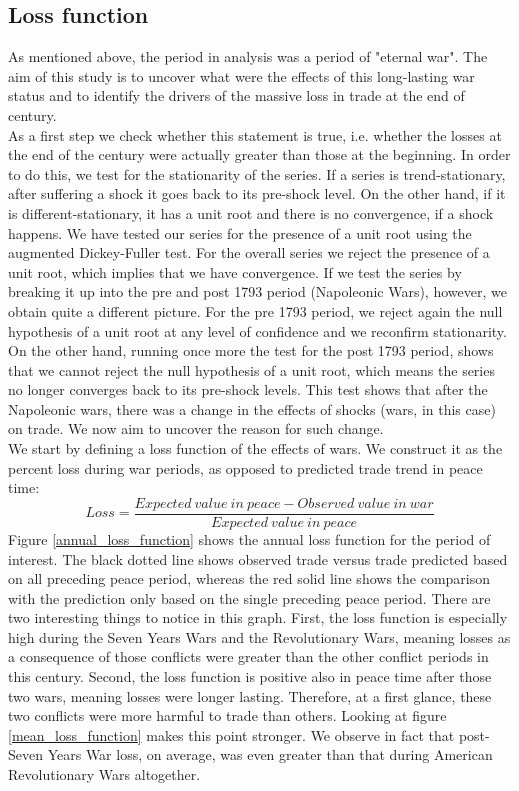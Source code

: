\documentclass[12pt,a4paper,notitlepage,english]{article}
\begin{document}
\subsection{Loss function}
As mentioned above, the period in analysis was a period of "eternal war". The aim of this study is to uncover what were the effects of this long-lasting war status and to identify the drivers of the massive loss in trade at the end of century. \\ %
As a first step we check whether this statement is true, i.e. whether the losses at the end of the century were actually greater than those at the beginning. In order to do this, we test for the stationarity of the series. If a series is trend-stationary, after suffering a shock it goes back to its pre-shock level. On the other hand, if it is different-stationary, it has a unit root and there is no convergence, if a shock happens. We have tested our series for the presence of a unit root using the augmented Dickey-Fuller test. For the overall series we reject the presence of a unit root, which implies that we have convergence. If we test the series by breaking it up into the pre and post 1793 period (Napoleonic Wars), however, we obtain quite a different picture. For the pre 1793 period, we reject again the null hypothesis of a unit root at any level of confidence and we reconfirm stationarity. On the other hand, running once more the test for the post 1793 period, shows that we cannot reject the null hypothesis of a unit root, which means the series no longer converges back to its pre-shock levels. This test shows that after the Napoleonic wars, there was a change in the effects of shocks (wars, in this case) on trade. We now aim to uncover the reason for such change. \\
We start by defining a loss function of the effects of wars. We construct it as the percent loss during war periods, as opposed to predicted trade trend in peace time: 
\begin{equation*}
Loss = \frac{Expected \> value \> in \> peace - Observed \> value \> in \> war }{Expected \> value \> in \> peace}
\end{equation*}
Figure \ref{annual_loss_function} shows the annual loss function for the period of interest. The black dotted line shows observed trade versus trade predicted based on all preceding peace period, whereas the red solid line shows the comparison with the prediction only based on the single preceding peace period. There are two interesting things to notice in this graph. First, the loss function is especially high during the Seven Years Wars and the Revolutionary Wars, meaning losses as a consequence of those conflicts were greater than the other conflict periods in this century. Second, the loss function is positive also in peace time after those two wars, meaning losses were longer lasting. Therefore, at a first glance, these two conflicts were more harmful to trade than others. Looking at figure \ref{mean_loss_function} makes this point stronger. We observe in fact that post-Seven Years War loss, on average, was even greater than that during American Revolutionary Wars altogether. 
\end{document}

